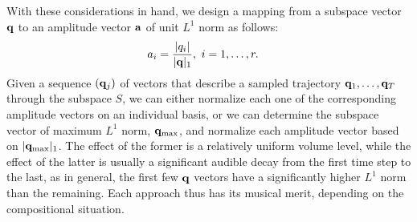 \documentclass[11pt]{article}
\begin{document}
With these considerations in hand, we design a mapping from a subspace vector $\mathbf{q}$ to an amplitude vector $\mathbf{a}$ of unit $L^1$ norm as follows:
\begin{equation}
\begin{aligned}
a_i &= \frac{\lvert q_i \rvert}{\lvert\mathbf{q}\rvert_1}, \ i = 1, \ldots, r.
\end{aligned}
\end{equation}
Given a sequence $(\mathbf{q}_j)$ of vectors that describe a sampled trajectory $\mathbf{q}_1, \ldots, \mathbf{q}_T$ through the subspace $S$, we can either normalize each one of the corresponding amplitude vectors on an individual basis, or we can determine the subspace vector of maximum $L^1$ norm, $\mathbf{q}_{\textnormal{max}}$, and normalize each amplitude vector based on $\lvert\mathbf{q}_{\textnormal{max}}\rvert_1$. The effect of the former is a relatively uniform volume level, while the effect of the latter is usually a significant audible decay from the first time step to the last, as in general, the first few $\mathbf{q}$ vectors have a significantly higher $L^1$ norm than the remaining. Each approach thus has its musical merit, depending on the compositional situation.
\end{document}
